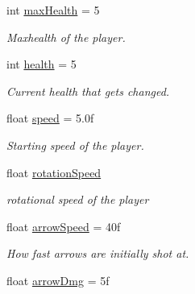 \begin{DoxyCompactItemize}
\item 
\mbox{\label{class_player_ac51bc0232fa16f956acee68e1635f7dc}} 
int \hyperlink{class_player_ac51bc0232fa16f956acee68e1635f7dc}{max\+Health} = 5
\begin{DoxyCompactList}\small\item\em Maxhealth of the player. \end{DoxyCompactList}\item 
\mbox{\label{class_player_ab064f330cef84e2e062fd6446db24184}} 
int \hyperlink{class_player_ab064f330cef84e2e062fd6446db24184}{health} = 5
\begin{DoxyCompactList}\small\item\em Current health that gets changed. \end{DoxyCompactList}\item 
\mbox{\label{class_player_abd2291a934964b32e9bc06a7738042d3}} 
float \hyperlink{class_player_abd2291a934964b32e9bc06a7738042d3}{speed} = 5.\+0f
\begin{DoxyCompactList}\small\item\em Starting speed of the player. \end{DoxyCompactList}\item 
\mbox{\label{class_player_a28b98e6712f03b881b07792d3c457f65}} 
float \hyperlink{class_player_a28b98e6712f03b881b07792d3c457f65}{rotation\+Speed}
\begin{DoxyCompactList}\small\item\em rotational speed of the player \end{DoxyCompactList}\item 
\mbox{\label{class_player_ad71f4fd6a20074d500df63092298de62}} 
float \hyperlink{class_player_ad71f4fd6a20074d500df63092298de62}{arrow\+Speed} = 40f
\begin{DoxyCompactList}\small\item\em How fast arrows are initially shot at. \end{DoxyCompactList}\item 
\mbox{\label{class_player_aecc56aacf8bc7000018ee06406a60076}} 
float \hyperlink{class_player_aecc56aacf8bc7000018ee06406a60076}{arrow\+Dmg} = 5f

\end{DoxyCompactItemize}
